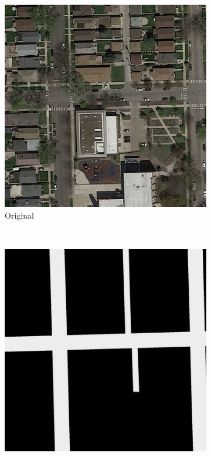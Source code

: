\documentclass[10pt,conference,compsocconf]{IEEEtran}
\begin{document}
\begin{figure}[!h]
	\centering
	\begin{subfigure}[b]{0.12\textwidth}
		\includegraphics[width=\textwidth]{image2.png}
		\caption{Original}
	\end{subfigure}
	~ %
	\begin{subfigure}[b]{0.12\textwidth}
		\includegraphics[width=\textwidth]{gt2.png}

\end{subfigure}
\end{figure}
\end{document}
